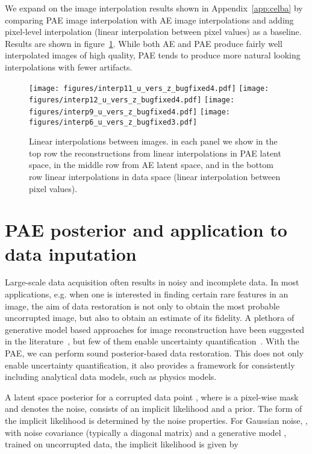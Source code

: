 \documentclass[10pt]{article} \usepackage[accepted]{tmlr}
\newcommand{\rev}[1]{{\color{black}#1}}
\begin{document}
\rev{We expand on the image interpolation results shown in Appendix~\ref{app:celba} by comparing PAE image interpolation with AE image interpolations and adding pixel-level interpolation (linear interpolation between pixel values) as a baseline. Results are shown in figure~\ref{fig:interp_study}. While both AE and PAE produce fairly well interpolated images of high quality, PAE tends to produce more natural looking interpolations with fewer artifacts. 
\begin{figure}
\begin{center}
\texttt{[image: figures/interp11\_u\_vers\_z\_bugfixed4.pdf]}
\texttt{[image: figures/interp12\_u\_vers\_z\_bugfixed4.pdf]}
\texttt{[image: figures/interp9\_u\_vers\_z\_bugfixed4.pdf]}
\texttt{[image: figures/interp6\_u\_vers\_z\_bugfixed3.pdf]}

\caption{Linear interpolations between images. in each panel we show in the top row the reconstructions from linear interpolations in PAE latent space, in the middle row from AE latent space, and in the bottom row linear interpolations in data space (linear interpolation between pixel values).}
\label{fig:interp_study}
\end{center}
\end{figure}}

\section{PAE posterior and application to data inputation}
\label{app:recon}
Large-scale data acquisition often results in noisy and incomplete data. In most applications, e.g. when one is interested in finding certain rare features in an image, the aim of data restoration is not only to obtain the most probable uncorrupted image, but also to obtain an estimate of its fidelity. 
A plethora of generative model based approaches for image reconstruction have been suggested in the literature~\citep{RezendeMW14, Mattei2018, DongLHT15, JinMcCann2016, RIMPutzky, DeepImagePrior, AmbientGAN, MIWAE}, but few of them enable uncertainty quantification~\citep{DeepUQ}. With the PAE, we can perform sound posterior-based data restoration. This does not only enable uncertainty quantification, it also provides a framework for consistently including analytical data models, such as physics models.

A latent space posterior for a corrupted data point , where  is a pixel-wise mask and  denotes the noise, consists of an implicit likelihood and a prior. The form of the implicit likelihood is determined by the noise properties. For Gaussian noise, , with noise 
covariance 
(typically a diagonal matrix) and a generative model , trained on uncorrupted data, the implicit likelihood is given by
\end{document}
